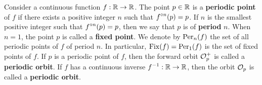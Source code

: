 \begin{defn}
Consider a continuous function $f:\mathbb{R} \rightarrow \mathbb{R}$.  The point
$p \in \mathbb{R}$ is a {\bfseries periodic point} of
$f$ if there exists a positive integer $n$ such that
$\displaystyle f^{\circ n}(p) = p$.  If $n$ is the smallest positive integer
such that $\displaystyle f^{\circ n}(p)=p$, then we say that 
$p$ is of {\bfseries period} $n$.  When $n=1$, the point
$p$ is called a {\bfseries fixed point}.
We denote by $\operatorname{Per}_n(f)$ the set of all periodic points of $f$ of
period $n$.  In particular, $\operatorname{Fix}(f) = \operatorname{Per}_1(f)$ is the set of fixed
points of $f$.  If $p$ is a periodic point of $f$, then the forward orbit
$\displaystyle \mathcal{O}_p^+$ is called a
{\bfseries periodic orbit}.  If $f$ has a
continuous inverse $\displaystyle f^{-1}:\mathbb{R}\rightarrow \mathbb{R}$, then
the orbit $\displaystyle \mathcal{O}_p$ is called a
{\bfseries periodic orbit}.
\end{defn}

